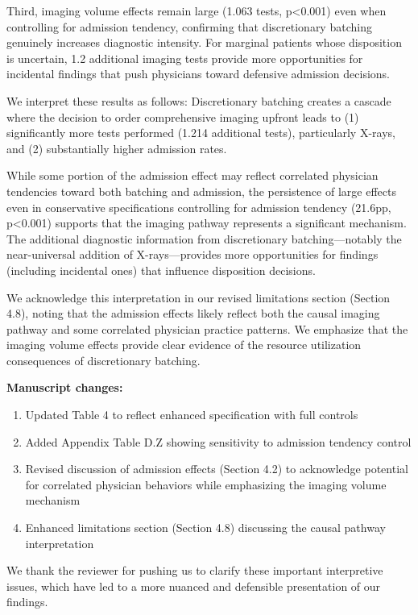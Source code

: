 \documentclass[11pt]{article}
\newcommand{\1}{\hbox{\rm 1\kern-.35em 1}}
\begin{document}
Third, imaging volume effects remain large (1.063 tests, p<0.001) even when controlling for admission tendency, confirming that discretionary batching genuinely increases diagnostic intensity. For marginal patients whose disposition is uncertain, 1.2 additional imaging tests provide more opportunities for incidental findings that push physicians toward defensive admission decisions.

We interpret these results as follows: Discretionary batching creates a cascade where the decision to order comprehensive imaging upfront leads to (1) significantly more tests performed (1.214 additional tests), particularly X-rays, and (2) substantially higher admission rates. 

While some portion of the admission effect may reflect correlated physician tendencies toward both batching and admission, the persistence of large effects even in conservative specifications controlling for admission tendency (21.6pp, p<0.001) supports that the imaging pathway represents a significant mechanism. The additional diagnostic information from discretionary batching—notably the near-universal addition of X-rays—provides more opportunities for findings (including incidental ones) that influence disposition decisions.

We acknowledge this interpretation in our revised limitations section (Section 4.8), noting that the admission effects likely reflect both the causal imaging pathway and some correlated physician practice patterns. We emphasize that the imaging volume effects provide clear evidence of the resource utilization consequences of discretionary batching.

\textbf{Manuscript changes:}

\begin{enumerate}
\item Updated Table 4 to reflect enhanced specification with full controls
\item Added Appendix Table D.Z showing sensitivity to admission tendency control
\item Revised discussion of admission effects (Section 4.2) to acknowledge potential for correlated physician behaviors while emphasizing the imaging volume mechanism
\item Enhanced limitations section (Section 4.8) discussing the causal pathway interpretation
\end{enumerate}

We thank the reviewer for pushing us to clarify these important interpretive issues, which have led to a more nuanced and defensible presentation of our findings.
\color{black}
\end{document}
